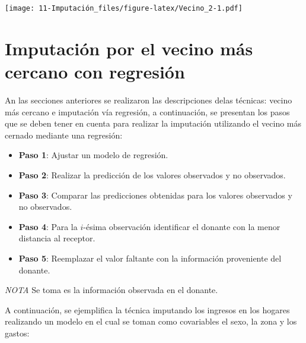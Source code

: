 \documentclass[
  12pt,
]{book}
\newenvironment{Shaded}{\begin{snugshade}}{\end{snugshade}}
\newcommand{\AttributeTok}[1]{\textcolor[rgb]{0.77,0.63,0.00}{#1}}
\newcommand{\FunctionTok}[1]{\textcolor[rgb]{0.00,0.00,0.00}{#1}}
\newcommand{\NormalTok}[1]{#1}
\newcommand{\OtherTok}[1]{\textcolor[rgb]{0.56,0.35,0.01}{#1}}
\newcommand{\SpecialCharTok}[1]{\textcolor[rgb]{0.00,0.00,0.00}{#1}}
\providecommand{\tightlist}{%
  \setlength{\itemsep}{0pt}\setlength{\parskip}{0pt}}
\begin{document}
\texttt{[image: 11-Imputación\_files/figure-latex/Vecino\_2-1.pdf]}

\hypertarget{imputaciuxf3n-por-el-vecino-muxe1s-cercano-con-regresiuxf3n}{%
\section{Imputación por el vecino más cercano con regresión}\label{imputaciuxf3n-por-el-vecino-muxe1s-cercano-con-regresiuxf3n}}

An las secciones anteriores se realizaron las descripciones delas técnicas: vecino más cercano e imputación vía regresión, a continuación, se presentan los pasos que se deben tener en cuenta para realizar la imputación utilizando el vecino más cernado mediante una regresión:

\begin{itemize}
\tightlist
\item
  \textbf{Paso 1}: Ajustar un modelo de regresión.
\item
  \textbf{Paso 2}: Realizar la predicción de los valores observados y no
  observados.
\item
  \textbf{Paso 3}: Comparar las predicciones obtenidas para los valores observados
  y no observados.
\item
  \textbf{Paso 4}: Para la \(i\)-ésima observación identificar el donante con la
  menor distancia al receptor.
\item
  \textbf{Paso 5}: Reemplazar el valor faltante con la información proveniente del
  donante.
\end{itemize}

\emph{NOTA} Se toma es la información observada en el donante.

A continuación, se ejemplifica la técnica imputando los ingresos en los hogares realizando un modelo en el cual se toman como covariables el sexo, la zona y los gastos:

\begin{Shaded}
\end{Shaded}
\end{document}
